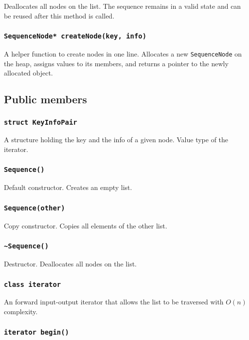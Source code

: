 ﻿\documentclass{article}
\begin{document}
Deallocates all nodes on the list. The sequence remains in a valid state and can
be reused after this method is called.

\subsubsection{{\tt SequenceNode* createNode(key, info)}}

A helper function to create nodes in one line. Allocates a new
{\tt SequenceNode} on the heap, assigns values to its members, and returns a
pointer to the newly allocated object.

\subsection{Public members}

\subsubsection{{\tt struct KeyInfoPair}}

A structure holding the key and the info of a given node. Value type of the
iterator.

\subsubsection{{\tt Sequence()}}

Default constructor. Creates an empty list.

\subsubsection{{\tt Sequence(other)}}

Copy constructor. Copies all elements of the other list.

\subsubsection{{\tt \~{}Sequence()}}

Destructor. Deallocates all nodes on the list.

\subsubsection{{\tt class iterator}}

An forward input-output iterator that allows the list to be traversed with
$O(n)$ complexity.

\subsubsection{{\tt iterator begin()}}
\end{document}
